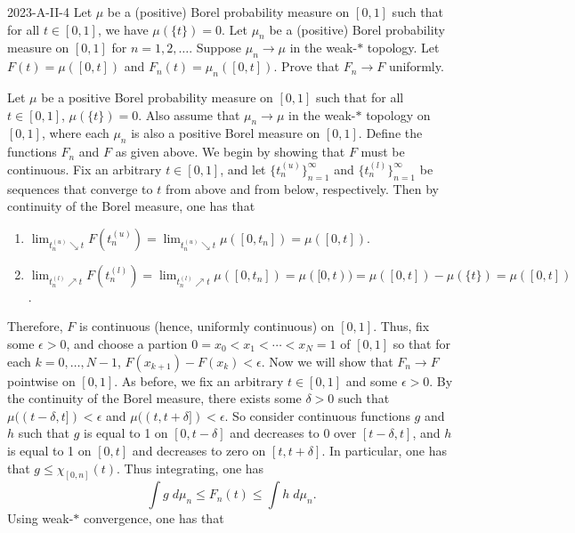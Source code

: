 \documentclass{article}
\begin{document}
	\begin{prb}{2023-A-II-4}
		Let $\mu$ be a (positive) Borel probability measure on $[0,1]$ such that for all $t \in [0,1]$, we have $\mu(\{t\}) = 0$. Let $\mu_n$ be a (positive) Borel probability measure on $[0,1]$ for $n = 1, 2, \ldots$. Suppose $\mu_n \to \mu$ in the weak-$\ast$ topology. Let $F(t) = \mu([0,t])$ and $F_n(t) = \mu_n([0,t])$. Prove that $F_n \to F$ uniformly. 
	\end{prb}
	Let $\mu$ be a positive Borel probability measure on $[0,1]$ such that for all $t \in [0,1]$, $\mu(\{t\}) = 0$. Also assume that $\mu_n \to \mu$ in the weak-$\ast$ topology on $[0,1]$, where each $\mu_n$ is also a positive Borel measure on $[0,1]$. Define the functions $F_n$ and $F$ as given above. We begin by showing that $F$ must be continuous. Fix an arbitrary $t \in [0,1]$, and let $\{t^{(u)}_{n}\}_{n = 1}^{\infty}$ and $\{t_{n}^{(l)}\}_{n = 1}^{\infty}$ be sequences that converge to $t$ from above and from below, respectively. Then by continuity of the Borel measure, one has that 
	\begin{enumerate}[itemsep =-2pt,label  =(\arabic{*})]
		\item $\lim_{t_{n}^{(u)} \searrow t}F(t_n^{(u)}) = \lim_{t_{n}^{(u)}\searrow t}\mu([0,t_{n}]) = \mu([0,t])$. 
		\item $\lim_{t_{n}^{(l)} \nearrow t}F(t_n^{(l)})  = \lim_{t_{n}^{(l)} \nearrow t}\mu([0,t_n]) = \mu([0,t)) = \mu([0,t]) - \mu(\{t\}) = \mu([0,t])$.
	\end{enumerate}
	Therefore, $F$ is continuous (hence, uniformly continuous) on $[0,1]$. Thus, fix some $\epsilon > 0$, and choose a partion $0 = x_0 < x_1 < \dotsm < x_{N} = 1$ of $[0,1]$ so that for each $k = 0, \ldots, N - 1$, $F(x_{k + 1}) - F(x_k) < \epsilon$. Now we will show that $F_{n} \to F$ pointwise on $[0,1]$. As before, we fix an arbitrary $t \in [0,1]$ and some $\epsilon > 0$. By the continuity of the Borel measure, there exists some $\delta > 0$ such that $\mu((t - \delta, t]) < \epsilon$ and $\mu((t, t + \delta]) < \epsilon$. So consider continuous functions $g$ and $h$ such that $g$ is equal to 1 on $[0,t - \delta]$ and decreases to 0 over $[t - \delta, t]$, and $h$ is equal to 1 on $[0,t]$ and decreases to zero on $[t, t + \delta]$. In particular, one has that $g \leq \chi_{[0,n]}(t)$. Thus integrating, one has 
	\begin{equation*}
		\int g\;d\mu_n \leq F_{n}(t) \leq \int h\;d\mu_{n}. 
	\end{equation*}
	Using weak-$\ast$ convergence, one has that 
\end{document}
